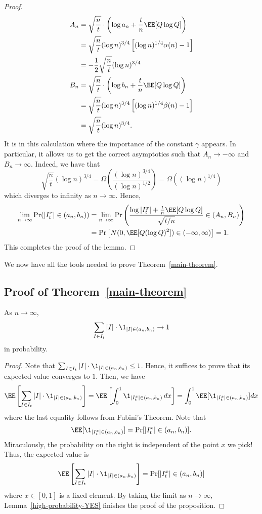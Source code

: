 \documentclass[12pt]{article}
\begin{document}
\begin{proof}
\begin{align*}
	A_n & = \sqrt{\frac{n}{t}} \cdot \left ( \log a_n + \frac{t}{n} \EE[Q \log Q] \right ) \\
	& = \sqrt{\frac{n}{t}} (\log n)^{3/4} \left [ (\log n)^{1/4} \alpha(n) - 1 \right ] \\
	& = - \frac{1}{2} \sqrt{ \frac{n}{t}} (\log n)^{3/4} \\
	B_n & = \sqrt{\frac{n}{t}} \cdot \left ( \log b_n + \frac{t}{n} \EE[Q \log Q] \right ) \\
	& = \sqrt{\frac{n}{t}} (\log n)^{3/4} \left [ (\log n)^{1/4} \beta(n) - 1 \right ] \\
	& = \sqrt{\frac{n}{t}} (\log n)^{3/4}.
\end{align*}
It is in this calculation where the importance of the constant $\gamma$ appears. In particular, it allows us to get the correct asymptotics such that $A_n \to -\infty$ and $B_n \to \infty$. Indeed, we have that 
\[
	\sqrt{\frac{n}{t}} (\log n)^{3/4} = \Omega \left ( \frac{(\log n)^{3/4}}{(\log n)^{1/2}}\right ) = \Omega \left ( (\log n)^{1/4} \right )
\]
which diverges to infinity as $n \to \infty$. Hence, 
\begin{align*}
	\lim_{n \to \infty} \Pr (|I_t^x| \in (a_n, b_n)) & = \lim_{n \to \infty} \Pr \left ( \frac{\log |I_t^x| + \frac{t}{n} \EE[Q \log Q]}{\sqrt{t/n}} \in (A_n, B_n) \right ) \\
	& = \Pr \left [N(0, \EE[Q (\log Q)^2]) \in (-\infty, \infty) \right ] = 1.
\end{align*}
This completes the proof of the lemma. 

\end{proof}
We now have all the tools needed to prove Theorem~\ref{main-theorem}. 

\subsection{Proof of Theorem~\ref{main-theorem}}

\begin{prop} \label{zero-approximation}
	As $n \to \infty$, 
	\[
		\sum_{I \in I_t} |I| \cdot \1_{|I| \in (a_n, b_n)} \to 1
	\]
	in probability. 
\end{prop}

\begin{proof}
	Note that $\sum_{I \in I_t} |I| \cdot \1_{|I| \in (a_n, b_n)} \leq 1$. Hence, it suffices to prove that its expected value converges to $1$. Then, we have
	\[
		\EE \left [ \sum_{I \in I_t} |I| \cdot \1_{|I| \in (a_n, b_n)} \right ] = \EE \left [ \int_0^1 \1_{|I_t^x| \in (a_n, b_n)} \, dx \right ] = \int_0^1 \EE[\1_{|I_t^x| \in (a_n, b_n)} ] dx
	\]
	where the last equality follows from Fubini's Theorem. Note that 
	\[
		\EE[\1_{|I_t^x| \in (a_n, b_n)}] = \Pr[|I_t^x| \in (a_n, b_n)].
	\]
	Miraculously, the probability on the right is independent of the point $x$ we pick! Thus, the expected value is
	\[ 
		\EE \left [ \sum_{I \in I_t} |I| \cdot \1_{|I| \in (a_n, b_n)} \right ] = \Pr[|I_t^x| \in (a_n, b_n)]
	\]
	where $x \in [0, 1]$ is a fixed element. By taking the limit as $n \to \infty$, Lemma~\ref{high-probability-YES} finishes the proof of the proposition. 
\end{proof}
\end{document}
